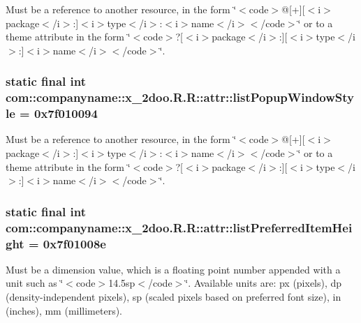 Must be a reference to another resource, in the form \char`\"{}$<$code$>$@\mbox{[}+\mbox{]}\mbox{[}$<$i$>$package$<$/i$>$:\mbox{]}$<$i$>$type$<$/i$>$:$<$i$>$name$<$/i$>$$<$/code$>$\char`\"{} or to a theme attribute in the form \char`\"{}$<$code$>$?\mbox{[}$<$i$>$package$<$/i$>$:\mbox{]}\mbox{[}$<$i$>$type$<$/i$>$:\mbox{]}$<$i$>$name$<$/i$>$$<$/code$>$\char`\"{}. \hypertarget{classcom_1_1companyname_1_1x__2doo_1_1_r_1_1attr_986d9487bc98d9a809d4c913d0fbc2dd}{
\subsubsection[{listPopupWindowStyle}]{\setlength{\rightskip}{0pt plus 5cm}static final int com::companyname::x\_\-2doo.R.R::attr::listPopupWindowStyle = 0x7f010094}}
\label{classcom_1_1companyname_1_1x__2doo_1_1_r_1_1attr_986d9487bc98d9a809d4c913d0fbc2dd}


Must be a reference to another resource, in the form \char`\"{}$<$code$>$@\mbox{[}+\mbox{]}\mbox{[}$<$i$>$package$<$/i$>$:\mbox{]}$<$i$>$type$<$/i$>$:$<$i$>$name$<$/i$>$$<$/code$>$\char`\"{} or to a theme attribute in the form \char`\"{}$<$code$>$?\mbox{[}$<$i$>$package$<$/i$>$:\mbox{]}\mbox{[}$<$i$>$type$<$/i$>$:\mbox{]}$<$i$>$name$<$/i$>$$<$/code$>$\char`\"{}. \hypertarget{classcom_1_1companyname_1_1x__2doo_1_1_r_1_1attr_c7257c67946817a6b6d087790442ffb8}{
\subsubsection[{listPreferredItemHeight}]{\setlength{\rightskip}{0pt plus 5cm}static final int com::companyname::x\_\-2doo.R.R::attr::listPreferredItemHeight = 0x7f01008e}}
\label{classcom_1_1companyname_1_1x__2doo_1_1_r_1_1attr_c7257c67946817a6b6d087790442ffb8}


Must be a dimension value, which is a floating point number appended with a unit such as \char`\"{}$<$code$>$14.5sp$<$/code$>$\char`\"{}. Available units are: px (pixels), dp (density-independent pixels), sp (scaled pixels based on preferred font size), in (inches), mm (millimeters). 

